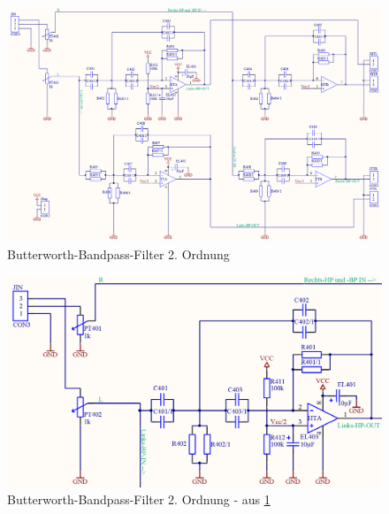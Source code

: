 \begin{figure} [ht]
	\centering	
	\includegraphics[width=1\textwidth]{img/Print4/4_TTuHTWeiche-Schematic.PNG}
	\caption{Butterworth-Bandpass-Filter 2. Ordnung}
	\label {fig:abb5.2.4.1}
\end{figure}

\begin{figure} [ht]
	\centering	
	\includegraphics[width=1\textwidth]{img/Print4/4_TTuHTWeiche-LinksHP-Schematic.PNG}
	\caption{Butterworth-Bandpass-Filter 2. Ordnung - aus \ref{fig:abb5.2.4.1}}
	\label {fig:abb5.2.4.2}
\end{figure}

